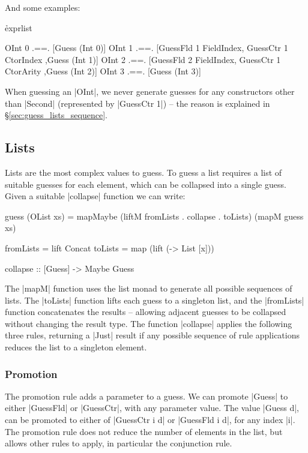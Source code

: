\documentclass[preprint,draft]{sigplanconf}
\begin{document}
\noindent And some examples:

\h{exprlist}\begin{code}
OInt 0  .==.  [Guess (Int 0)]
OInt 1  .==.  [GuessFld 1 FieldIndex, GuessCtr 1 CtorIndex
              ,Guess (Int 1)]
OInt 2  .==.  [GuessFld 2 FieldIndex, GuessCtr 1 CtorArity
              ,Guess (Int 2)]
OInt 3  .==.  [Guess (Int 3)]
\end{code}

When guessing an |OInt|, we never generate guesses for any constructors other than |Second| (represented by |GuessCtr 1|) -- the reason is explained in \S\ref{sec:guess_lists_sequence}.

\subsection{Lists}
\label{sec:guess_lists}

Lists are the most complex values to guess. To guess a list requires a list of suitable guesses for each element, which can be collapsed into a single guess. Given a suitable |collapse| function we can write:

\begin{code}
guess (OList xs) = mapMaybe
    (liftM fromLists . collapse . toLists) (mapM guess xs)

fromLists  = lift Concat
toLists    = map (lift (\x -> List [x]))

collapse :: [Guess] -> Maybe Guess
\end{code}

The |mapM| function uses the list monad to generate all possible sequences of lists. The |toLists| function lifts each guess to a singleton list, and the |fromLists| function concatenates the results -- allowing adjacent guesses to be collapsed without changing the result type. The function |collapse| applies the following three rules, returning a |Just| result if any possible sequence of rule applications reduces the list to a singleton element.

\subsubsection{Promotion}

The promotion rule adds a parameter to a guess. We can promote |Guess| to either |GuessFld| or |GuessCtr|, with any parameter value. The value |Guess d|, can be promoted to either of |GuessCtr i d| or |GuessFld i d|, for any index |i|. The promotion rule does not reduce the number of elements in the list, but allows other rules to apply, in particular the conjunction rule.
\end{document}

